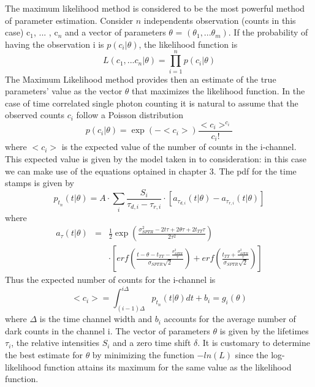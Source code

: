The maximum likelihood method is considered to be the most powerful method of parameter estimation.
Consider $n$ independents observation (counts in this case) c$_{1}$, ... , c$_{n}$ and a vector of parameters \textbf{$\theta$} = $(\theta _{1},...\theta _{m})$. If the probability of having the observation i is $p(c_{i}|\theta)$, the likelihood function is
\begin{equation}
L(c_{1},...c_{n}|\theta) = \prod _{i = 1} ^{n} p(c_{i}|\theta) 
\end{equation}
The Maximum Likelihood method provides then an estimate of the true parameters' value as the vector \textbf{$\theta$} that maximizes the likelihood function.
In the case of time correlated single photon counting it is natural to assume that the observed counts $c_{i}$ follow a Poisson distribution
\begin{equation}
p(c_{i}|\theta) = \exp{ \left( -<c_{i}>\right) }\frac{<c_{i}>^{c_{i}}}{c_{i}!}
\end{equation}
where $<c_{i}>$ is the expected value of the number of counts in the i-channel.
This expected value is given by the model taken in to consideration: in this case we can make use of the equations optained in chapter 3. The pdf for the time stamps is given by
\begin{equation}
p_{t_{n}}(t|\theta) = A \cdot \sum _{i} \frac{S_{i}}{\tau _{d,i} - \tau _{r,i}} \cdot \left[ a_{\tau _{d, i}}(t|\theta) - a_{\tau _{r,i}}(t|\theta)\right]
\end{equation}
where 
\begin{eqnarray}
a _{\tau}(t|\theta) &=& \frac{1}{2} \exp{\left(\frac{\sigma _{SPTR} ^{2} - 2t\tau +2\theta \tau + 2t_{TT}\tau}{2\tau ^{2}}\right)} \\
&& \cdot \left[ erf\left( \frac{t-\theta -t_{TT} - \frac{\sigma ^{2}_{SPTR}}{\tau}}{\sigma _{SPTR}\sqrt{2}} \right) + erf \left( \frac{t_{TT}+\frac{\sigma ^{2} _{SPTR}}{\tau}}{\sigma _{SPTR}\sqrt{2}} \right) \right]
\end{eqnarray}
Thus the expected number of counts for the i-channel is
\begin{equation}
<c_{i}> = \int _{(i-1)\Delta} ^{i\Delta} p_{t_{n}}(t|\theta)dt + b_{i} = g _{i}(\theta)
\end{equation}
where $\Delta$ is the time channel width and $b_{i}$ accounts for the average number of dark counts in the channel i.
The vector of parameters \textbf{$\theta$} is given by the lifetimes $\tau _{i}$, the relative intensities $S_{i}$ and a zero time shift $\delta$.
It is customary to determine the best estimate for \textbf{$\theta$} by minimizing the function $-ln(L)$ since the log-likelihood function attains its maximum for the same value as the likelihood function.
